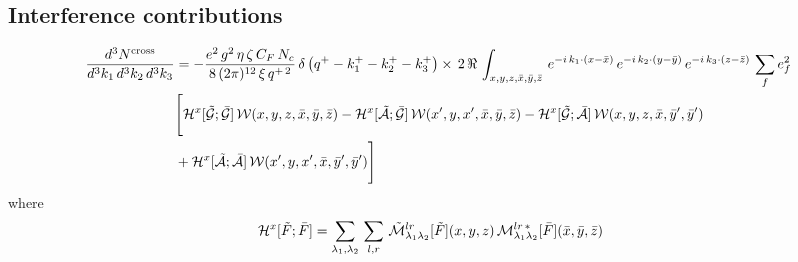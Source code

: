 \documentclass[9pt]{article}
\numberwithin{equation}{section}
\begin{document}
\subsection{Interference contributions} 
\begin{align}
     \frac{d^{3}N^{\text{cross}}}{d^{3}k_{1}\,d^{3}k_{2}\, d^{3}k_{3}} & = -\frac{e^{2}\,g^{2}\,\eta\,\zeta\,C_{F}\,N_{c}}{8\, (2\pi)^{12}\,\xi\,q^{+\,2}}\, \delta\left(q^{+}-k^{+}_{1}-k^{+}_{2}-k^{+}_{3}\right)\times\, 2\,\mathcal{\Re}\,\int_{x,y,z,\Bar{x},\Bar{y},\Bar{z}}\, e^{-i\,k_{1}\cdot (x-\Bar{x})}\, e^{-i\,k_{2}\cdot (y-\Bar{y})}\, e^{-i\,k_{3}\cdot (z-\Bar{z})}\,\sum_{f}e^{2}_{f}\notag \\ &  \Bigg[\mathcal{H}^{x}[\mathcal{\Tilde{G}};\Bar{\mathcal{G}}]\,\mathcal{W}(x,y,z,\Bar{x},\Bar{y},\Bar{z})-\mathcal{H}^{x}[\Tilde{\mathcal{A}};\Bar{\mathcal{G}}]\,\mathcal{W}(x',y,x',\Bar{x},\Bar{y},\Bar{z})-\mathcal{H}^{x}[\Tilde{\mathcal{G}};\Bar{\mathcal{A}}]\,\mathcal{W}(x,y,z,\Bar{x},\Bar{y}',\Bar{y}')\notag \\ & +\mathcal{H}^{x}[\Tilde{\mathcal{A}};\Bar{\mathcal{A}}]\,\mathcal{W}(x',y,x',\Bar{x},\Bar{y}',\Bar{y}')\Bigg]
\end{align}  
where
\begin{align}
    \mathcal{H}^{x} [\Tilde{F};\Bar{F}] & = \sum_{\lambda_{1},\lambda_{2}}\, \sum_{l,r}\, \mathcal{\Tilde{M}}^{lr}_{\lambda_{1}\lambda_{2}}[\Tilde{F}](x,y,z)\,\mathcal{M}^{lr\,*}_{\lambda_{1}\lambda_{2}}[\Bar{F}] (\Bar{x},\Bar{y},\Bar{z})
\end{align}
\end{document}
